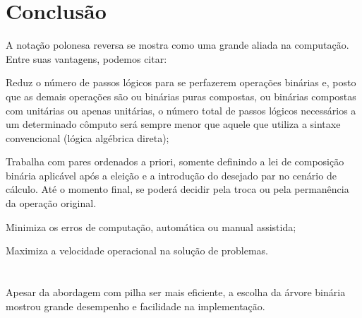 \documentclass{article}
\begin{document}
\section{Conclusão}

\begin{list_type}
\item
A notação polonesa reversa se mostra como uma grande aliada na computação. Entre suas vantagens, podemos citar:
\\
    \item Reduz o número de passos lógicos para se perfazerem operações binárias e, posto que as demais operações são ou binárias puras compostas, ou binárias compostas com unitárias ou apenas unitárias, o número total de passos lógicos necessários a um determinado cômputo será sempre menor que aquele que utiliza a sintaxe convencional (lógica algébrica direta);    \citep{adams1995hitchhiker}
    
    \item Trabalha com pares ordenados a priori, somente definindo a lei de composição binária aplicável após a eleição e a introdução do desejado par no cenário de cálculo. Até o momento final, se poderá decidir pela troca ou pela permanência da operação original.   \citep{adams1995hitchhiker}
    
    \item Minimiza os erros de computação, automática ou manual assistida;   \citep{adams1995hitchhiker}
    
    \item Maximiza a velocidade operacional na solução de problemas.   \citep{adams1995hitchhiker}
\\
\\
\\
Apesar da abordagem com pilha ser mais eficiente, a escolha da árvore binária mostrou grande desempenho e facilidade na implementação.
\end{list_type}






\end{document}
